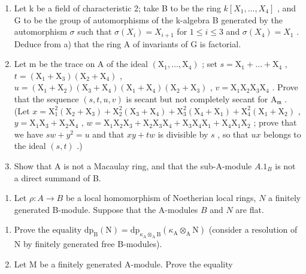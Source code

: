 \begin{enumerate}
\def\labelenumi{\alph{enumi})}
\setcounter{enumi}{1}
\item
  Let k be a field of characteristic 2; take B to be the ring \(k[X_{1},\ldots,X_{4}]\) , and G to be the group of automorphisms of the k-algebra B generated by the automorphism \(\sigma\) such that \(\sigma(X_{i})=X_{i+1}\) for \(1\leqslant i\leqslant3\) and \(\sigma(X_{4})=X_{1}\) . Deduce from a) that the ring A of invariants of G is factorial.
\item
  Let m be the trace on \(\mathrm{A}\) of the ideal \((\mathrm{X}_1, \ldots, \mathrm{X}_4)\) ; set \(s = \mathrm{X}_1 + \ldots + \mathrm{X}_4\) , \(t = (\mathrm{X}_1 + \mathrm{X}_3)(\mathrm{X}_2 + \mathrm{X}_4)\) , \(u = (\mathrm{X}_1 + \mathrm{X}_2)(\mathrm{X}_3 + \mathrm{X}_4)(\mathrm{X}_1 + \mathrm{X}_4)(\mathrm{X}_2 + \mathrm{X}_3)\) , \(v = \mathrm{X}_1\mathrm{X}_2\mathrm{X}_3\mathrm{X}_4\) . Prove that the sequence \((s, t, u, v)\) is secant but not completely secant for \(\mathrm{A}_{\mathfrak{m}}\) . (Let \(x = \mathrm{X}_1^2(\mathrm{X}_2 + \mathrm{X}_3) + \mathrm{X}_2^2(\mathrm{X}_3 + \mathrm{X}_4) + \mathrm{X}_3^2(\mathrm{X}_4 + \mathrm{X}_1) + \mathrm{X}_4^2(\mathrm{X}_1 + \mathrm{X}_2)\) , \(y = \mathrm{X}_1\mathrm{X}_3 + \mathrm{X}_2\mathrm{X}_4\) , \(w = \mathrm{X}_1\mathrm{X}_2\mathrm{X}_3 + \mathrm{X}_2\mathrm{X}_3\mathrm{X}_4 + \mathrm{X}_3\mathrm{X}_4\mathrm{X}_1 + \mathrm{X}_4\mathrm{X}_1\mathrm{X}_2\) ; prove that we have \(sw + y^2 = u\) and that \(xy + tw\) is divisible by \(s\) , so that \(ux\) belongs to the ideal \((s, t)\) .)
\item
  Show that A is not a Macaulay ring, and that the sub-A-module \(A.1_{B}\) is not a direct summand of B.
\end{enumerate}


\begin{enumerate}
\def\labelenumi{\arabic{enumi})}
\tightlist
\item
  Let \(\rho: A \to B\) be a local homomorphism of Noetherian local rings, \(N\) a finitely generated B-module. Suppose that the A-modules \(B\) and \(N\) are flat.
\end{enumerate}

\begin{enumerate}
\def\labelenumi{\alph{enumi})}
\item
  Prove the equality \(\mathrm{dp}_{\mathrm{B}}(\mathrm{N}) = \mathrm{dp}_{\kappa_{\mathrm{A}} \otimes_{\mathrm{A}} \mathrm{B}}(\kappa_{\mathrm{A}} \otimes_{\mathrm{A}} \mathrm{N})\) (consider a resolution of N by finitely generated free B-modules).
\item
  Let M be a finitely generated A-module. Prove the equality
\end{enumerate}

